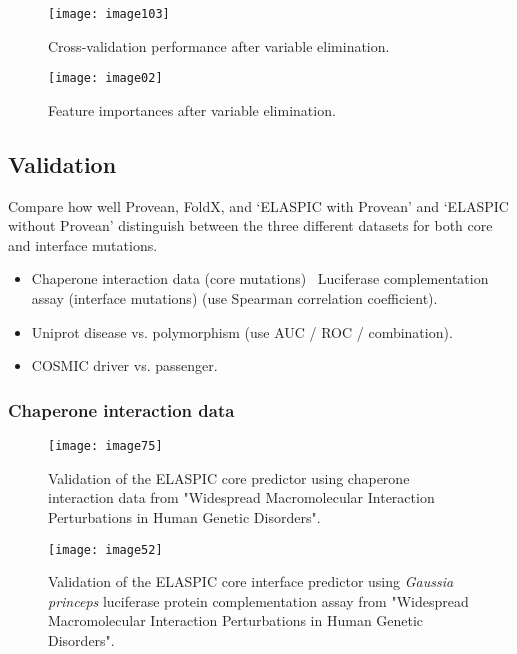 \begin{figure}[H]
	\centering
	\texttt{[image: image103]}
	\caption{Cross-validation performance after variable elimination.}
\end{figure}

\begin{figure}[H]
	\centering
	\texttt{[image: image02]}
	\caption{Feature importances after variable elimination.}
\end{figure}




\subsection{Validation}

Compare how well Provean, FoldX, and `ELASPIC with Provean' and `ELASPIC without Provean' distinguish between the three different datasets for both core and interface mutations.

\begin{itemize}
\item Chaperone interaction data (core mutations) \ Luciferase complementation assay (interface mutations) (use Spearman correlation coefficient).
\item Uniprot disease vs. polymorphism (use AUC / ROC / combination).
\item COSMIC driver vs. passenger.
\end{itemize}







\subsubsection{Chaperone interaction data}

\begin{figure}[H]
	\centering
	\texttt{[image: image75]}
	\caption[Core Validation]{Validation of the ELASPIC core predictor using chaperone interaction data from "Widespread Macromolecular Interaction Perturbations in Human Genetic Disorders".}
\end{figure}


\begin{figure}[H]
	\centering
	\texttt{[image: image52]}
	\caption[Interface Validation]{Validation of the ELASPIC core interface predictor using \textit{Gaussia princeps} luciferase protein complementation assay from "Widespread Macromolecular Interaction Perturbations in Human Genetic Disorders".}
\end{figure}









